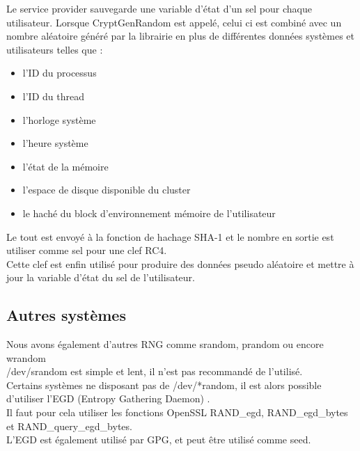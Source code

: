 		Le service provider sauvegarde une variable d’état d’un sel pour chaque 
		utilisateur. Lorsque CryptGenRandom est appelé, celui ci est combiné 
		avec un nombre aléatoire généré par la librairie en plus de différentes 
		données systèmes et utilisateurs telles que : \\
		\begin{itemize}
		\item l’ID du processus
		\item l'ID du thread
		\item l'horloge système
		\item l'heure système
		\item l'état de la mémoire
		\item l’espace de disque disponible du cluster
		\item le haché du block d'environnement mémoire de l’utilisateur\\
		\end{itemize} 
		
		Le tout est envoyé à la fonction de hachage SHA-1 et le nombre en sortie 
		est utiliser comme sel pour une clef RC4. \\
		
		Cette clef est enfin utilisé pour produire des données pseudo aléatoire 
		et mettre à jour la variable d’état du sel de l’utilisateur. 

	
	
	\subsection{Autres systèmes}
	
		Nous avons également d'autres RNG comme srandom, prandom ou
		encore wrandom \cite{miros2013}\\
		
		/dev/srandom est simple et lent, il n'est pas recommandé de l'utilisé.\\
	
		Certains systèmes ne disposant pas de /dev/*random, il est alors possible
		d'utiliser l'EGD (Entropy Gathering Daemon) \cite{egdsf.net}.\\
		
		Il faut pour cela utiliser les fonctions OpenSSL RAND\_egd, 
		RAND\_egd\_bytes et RAND\_query\_egd\_bytes. \\
		
		L'EGD est également utilisé par GPG, et peut être utilisé comme seed.




